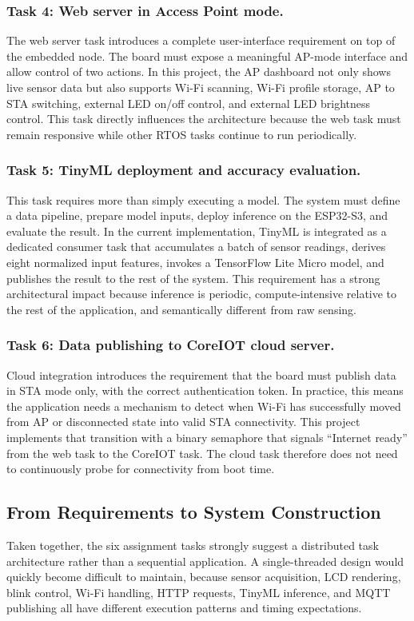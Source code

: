 \subsubsection*{Task 4: Web server in Access Point mode.}
The web server task introduces a complete user-interface requirement on top of
the embedded node. The board must expose a meaningful AP-mode interface and
allow control of two actions. In this project, the AP dashboard not only shows
live sensor data but also supports Wi-Fi scanning, Wi-Fi profile storage, AP to
STA switching, external LED on/off control, and external LED brightness
control. This task directly influences the architecture because the web task
must remain responsive while other RTOS tasks continue to run periodically.

\subsubsection*{Task 5: TinyML deployment and accuracy evaluation.}
This task requires more than simply executing a model. The system must define a
data pipeline, prepare model inputs, deploy inference on the ESP32-S3, and
evaluate the result. In the current implementation, TinyML is integrated as a
dedicated consumer task that accumulates a batch of sensor readings, derives
eight normalized input features, invokes a TensorFlow Lite Micro model, and
publishes the result to the rest of the system. This requirement has a strong
architectural impact because inference is periodic, compute-intensive relative
to the rest of the application, and semantically different from raw sensing.

\subsubsection*{Task 6: Data publishing to CoreIOT cloud server.}
Cloud integration introduces the requirement that the board must publish data in
STA mode only, with the correct authentication token. In practice, this means
the application needs a mechanism to detect when Wi-Fi has successfully moved
from AP or disconnected state into valid STA connectivity. This project
implements that transition with a binary semaphore that signals ``Internet
ready'' from the web task to the CoreIOT task. The cloud task therefore does
not need to continuously probe for connectivity from boot time.

\subsection{From Requirements to System Construction}
Taken together, the six assignment tasks strongly suggest a distributed task
architecture rather than a sequential application. A single-threaded design
would quickly become difficult to maintain, because sensor acquisition, LCD
rendering, blink control, Wi-Fi handling, HTTP requests, TinyML inference, and
MQTT publishing all have different execution patterns and timing expectations.

